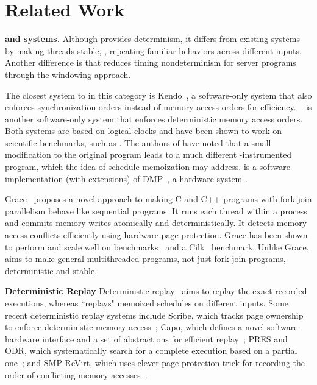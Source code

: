 \section{Related Work} \label{sec:tern-related}

\noindent
{\bf \smt and \dmt systems.} Although \tern provides determinism, it 
differs from existing \dmt systems~\cite{dmp:asplos09, coredet:asplos10, 
kendo:asplos09} by making threads stable, \ie, repeating familiar behaviors 
across different inputs. Another difference is that \tern reduces timing 
nondeterminism for server programs through the windowing approach.

The closest system to \tern in this category is
Kendo~\cite{kendo:asplos09}, a software-only \dmt system that also
enforces synchronization orders instead of memory access orders for
efficiency.  \coredet~\cite{coredet:asplos10} is another software-only \dmt
system that enforces deterministic memory access orders.  Both systems are
based on logical clocks and have been shown to work on scientific
benchmarks, such as \splash.  The authors of \coredet have noted that a small
modification to the original program leads to a much different
\coredet-instrumented program, which the idea of schedule memoization may
address.  \coredet is a software implementation (with extensions) of
DMP~\cite{dmp:asplos09}, a hardware \dmt system .

Grace~\cite{grace:oopsla09} proposes a novel approach to making C and C++
programs with fork-join parallelism behave like sequential programs.  It
runs each thread within a process and commits memory writes atomically and
deterministically.  It detects memory access conflicts efficiently using
hardware page protection.  Grace has been shown to perform and scale well
on \phoenix benchmarks~\cite{phoenix-benchmarks} and a Cilk~\cite{cilk}
benchmark.  Unlike Grace, \tern aims to make general multithreaded
programs, not just fork-join programs, deterministic and stable.

\noindent
{\bf Deterministic Replay} Deterministic
replay~\cite{r2:osdi,friday2007,srinivasan:flashback,revirt,dejavu,
vmware-record-replay,smp-revirt:vee08,pres:sosp09,scribe:sigmetrics10,odr:sosp09
,capo:asplos09}
aims to replay the exact recorded executions, whereas \tern ``replays"
memoized schedules on different inputs.  Some recent deterministic replay
systems include Scribe, which tracks page ownership to enforce
deterministic memory access~\cite{scribe:sigmetrics10}; Capo, which defines
a novel software-hardware interface and a set of abstractions for
efficient replay~\cite{capo:asplos09}; PRES and ODR, which
systematically search for a complete execution based on a partial
one~\cite{pres:sosp09,odr:sosp09}; and SMP-ReVirt, which uses clever page
protection trick for recording the order of conflicting memory
accesses~\cite{smp-revirt:vee08}.

